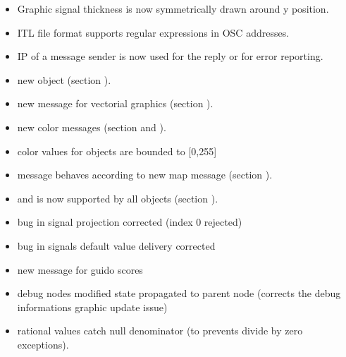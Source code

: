 \begin{itemize}
\item Graphic signal thickness is now symmetrically drawn around y position.
\item ITL file format supports regular expressions in OSC addresses.
\item IP of a message sender is now used for the reply or for error reporting.
\item new  object (section ).
\item new  message for vectorial graphics (section ).
\item new color messages  (section  and  ).
\item color values for objects are bounded to [0,255]
\item {} message behaves according to new map message (section ).
\item {} and   is now supported by all objects (section ).
\item  bug in signal projection corrected (index 0 rejected)
\item  bug in signals default value delivery corrected
\item  new  message for guido scores
\item  debug nodes modified state propagated to parent node (corrects the debug informations graphic update issue)
\item rational values catch null denominator (to prevents divide by zero exceptions).

\end{itemize}


